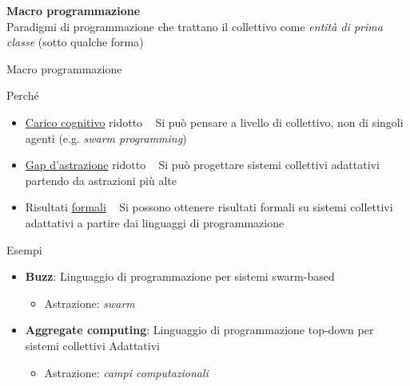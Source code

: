 \documentclass[presentation, 10pt,aspectratio=169]{beamer}\mode<presentation>{\usetheme{AMSBolognaFC}}
\begin{document}
{


\begin{frame}[c]
	
	{
	\color{customfg}

	\begin{center}
	\Large\textbf{Macro programmazione} \\
	Paradigmi di programmazione che trattano il \alert{collettivo} come \emph{entità di prima classe} (sotto qualche forma)
	\end{center}

	\vspace{1cm}	
}
\end{frame}
}
\begin{frame}{Macro programmazione}
	\begin{alertblock}{Perché}
		\begin{itemize}
			\item \underline{Carico cognitivo} ridotto \faArrowRight ~ Si può pensare a livello di collettivo, non di singoli agenti (e.g. \emph{swarm programming})
			\item \underline{Gap d'astrazione} ridotto \faArrowRight ~ Si può progettare sistemi collettivi adattativi partendo da astrazioni più alte
			\item Risultati \underline{formali} \faArrowRight ~ Si possono ottenere risultati formali su sistemi collettivi adattativi a partire dai linguaggi di programmazione
		\end{itemize}
	\end{alertblock}
	\begin{block}{Esempi}
		\begin{itemize}
			\item \textbf{Buzz}: Linguaggio di programmazione per sistemi swarm-based 
			\begin{itemize}
				\item Astrazione: \emph{swarm}
			\end{itemize}
			\item \alert{\textbf{Aggregate computing}}: Linguaggio di programmazione top-down per sistemi collettivi Adattativi
			\begin{itemize}
				\item Astrazione: \emph{campi computazionali}
			\end{itemize}
		\end{itemize}
	\end{block}
\end{frame}
\end{document}
